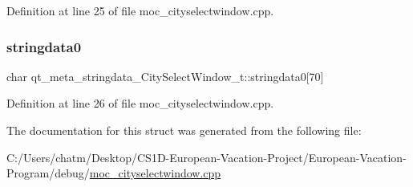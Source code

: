 Definition at line 25 of file moc\+\_\+cityselectwindow.\+cpp.

\mbox{\label{structqt__meta__stringdata___city_select_window__t_a87be28223e0ce0f734ed224649fef90e}} 
\subsubsection{\texorpdfstring{stringdata0}{stringdata0}}
{\footnotesize\ttfamily char qt\+\_\+meta\+\_\+stringdata\+\_\+\+City\+Select\+Window\+\_\+t\+::stringdata0\mbox{[}70\mbox{]}}



Definition at line 26 of file moc\+\_\+cityselectwindow.\+cpp.



The documentation for this struct was generated from the following file\+:\begin{DoxyCompactItemize}
\item 
C\+:/\+Users/chatm/\+Desktop/\+C\+S1\+D-\/\+European-\/\+Vacation-\/\+Project/\+European-\/\+Vacation-\/\+Program/debug/\mbox{\hyperlink{moc__cityselectwindow_8cpp}{moc\+\_\+cityselectwindow.\+cpp}}\end{DoxyCompactItemize}
